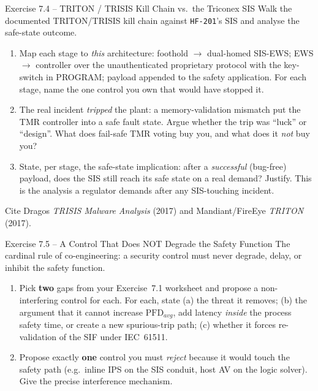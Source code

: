 \documentclass[11pt,a4paper]{article}
\begin{document}
\begin{taskbox}{Exercise 7.4 -- TRITON / TRISIS Kill Chain vs.\ the Triconex SIS}
Walk the documented TRITON/TRISIS kill chain against \texttt{HF-201}'s SIS and
analyse the safe-state outcome.
\begin{enumerate}\setlength{\itemsep}{1pt}
  \item Map each stage to \emph{this} architecture: foothold $\to$ dual-homed
        SIS-EWS; EWS $\to$ controller over the unauthenticated proprietary
        protocol with the key-switch in PROGRAM; payload appended to the safety
        application. For each stage, name the one control you own that would
        have stopped it.
  \item The real incident \emph{tripped} the plant: a memory-validation
        mismatch put the TMR controller into a safe fault state. Argue whether
        the trip was ``luck'' or ``design''. What does fail-safe TMR voting buy
        you, and what does it \emph{not} buy you?
  \item State, per stage, the safe-state implication: after a \emph{successful}
        (bug-free) payload, does the SIS still reach its safe state on a real
        demand? Justify. This is the analysis a regulator demands after any
        SIS-touching incident.
\end{enumerate}
Cite Dragos \emph{TRISIS Malware Analysis} (2017) and Mandiant/FireEye
\emph{TRITON} (2017).
\end{taskbox}

\begin{taskbox}{Exercise 7.5 -- A Control That Does NOT Degrade the Safety Function}
The cardinal rule of co-engineering: a security control must never degrade,
delay, or inhibit the safety function.
\begin{enumerate}\setlength{\itemsep}{1pt}
  \item Pick \textbf{two} gaps from your Exercise~7.1 worksheet and propose a
        non-interfering control for each. For each, state (a) the threat it
        removes; (b) the argument that it cannot increase $\mathrm{PFD}_{avg}$,
        add latency \emph{inside} the process safety time, or create a new
        spurious-trip path; (c) whether it forces re-validation of the SIF
        under IEC~61511.
  \item Propose exactly \textbf{one} control you must \emph{reject} because it
        would touch the safety path (e.g.\ inline IPS on the SIS conduit, host
        AV on the logic solver). Give the precise interference mechanism.
\end{enumerate}
\end{taskbox}
\end{document}
